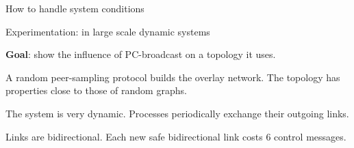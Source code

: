 \documentclass[10pt, xcolor={usenames, dvipsnames}]{beamer}
\begin{document}
\begin{frame}{How to handle system conditions}
  \vspace{-1em}

  \begin{center}
  \begin{minipage}{0.35\textwidth}
    \begin{center}
      
    \end{center}
  \end{minipage}
  \begin{minipage}{0.35\textwidth}
  \vspace{20pt}
    \begin{center}
      
    \end{center}
  \end{minipage}
  \end{center}    

  
\end{frame}



\begin{frame}{Experimentation: in large scale dynamic systems}
  
  \textbf{Goal}: show the influence of PC-broadcast on a topology it uses.

  \vspace{3em}

  A random peer-sampling protocol builds the overlay network. The topology has
  properties close to those of random graphs.
  
  \vspace{1em}

  The system is very dynamic. Processes periodically exchange their outgoing links.
  
  \vspace{1em}  

  Links are bidirectional. Each new safe bidirectional link costs 6 control
  messages.
  
\end{frame}
\end{document}

